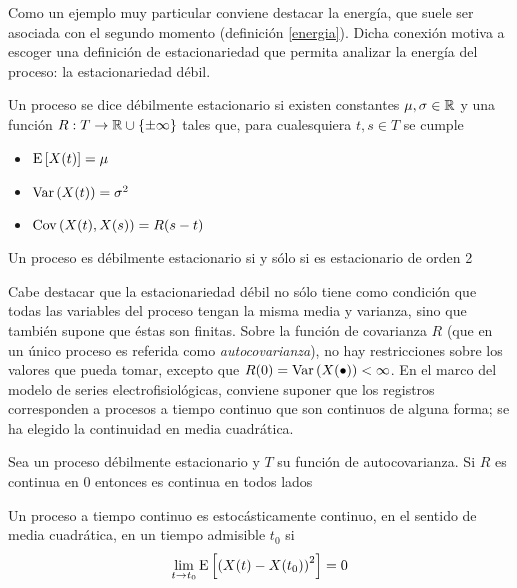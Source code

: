 Como un ejemplo muy particular conviene destacar la energía, que suele ser asociada con el segundo
momento (definición \ref{energia}). 
%
Dicha conexión motiva a escoger una definición de estacionariedad que permita analizar la energía 
del proceso: la estacionariedad débil.

\begin{definicion}
Un proceso \xt se dice débilmente estacionario si existen constantes $\mu, \sigma \in \mathbb{R}$ y una 
función $R : T \rightarrow \mathbb{R} \cup \{ \pm \infty \} $ tales que, para cualesquiera $t, s \in T$ se 
cumple
\begin{itemize}
\item $\mathrm{E}\left[ X(t) \right] = \mu$
\item $\mathrm{Var}\left( X(t) \right) = \sigma^{2}$
\item $\mathrm{Cov}\left( X(t),X(s) \right) = R(s-t)$
\end{itemize}
\end{definicion}

\begin{proposicion}
Un proceso es débilmente estacionario si y sólo si es estacionario de orden 2
\end{proposicion}

Cabe destacar que la estacionariedad débil no sólo tiene como condición que todas las variables del
proceso tengan la misma media y varianza, sino que también supone que éstas son finitas.
%
Sobre la función de covarianza $R$ (que en un único proceso es referida como \textit{autocovarianza}),
no hay restricciones sobre los valores que pueda tomar, excepto que 
$R(0) = \mathrm{Var}\left( X(\bullet) \right) < \infty$. 
%
En el marco del modelo de series electrofisiológicas, conviene suponer que los registros 
corresponden a procesos a tiempo continuo que son continuos de alguna forma; se ha elegido la 
continuidad en media cuadrática.

\begin{observacion}
Sea \xt un proceso débilmente estacionario y $T$ su función de autocovarianza. Si $R$ es continua
en 0 entonces es continua en todos lados
\end{observacion}

\begin{definicion}
Un proceso a tiempo continuo \xt es estocásticamente continuo, en el sentido de media cuadrática, 
en un tiempo admisible $t_0$ si
\begin{equation*}
\lim_{t \rightarrow t_0} \mathrm{E}\left[ \left( X(t) - X(t_0) \right)^{2} \right] = 0
\end{equation*}
\label{cont_est}
\end{definicion}

